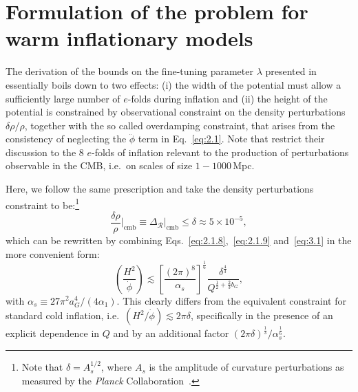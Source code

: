 \documentclass[aps,prd,twocolumn,amssymb,amsmath,floatfix,nofootinbib,superscriptaddress,preprintnumbers]{revtex4-1}
\begin{document}
\section{Formulation of the problem for warm inflationary models}
\label{sec:3}

The derivation of the bounds on the fine-tuning parameter $\lambda$ presented in~\cite{Adams:1990pn} essentially boils down to two effects: (i) the width of the potential must allow a sufficiently large number of $e$-folds during inflation and (ii)
the height of the potential is constrained by observational constraint on the density perturbations $\delta\rho/\rho$, together with the so called overdamping constraint, that arises from the consistency of neglecting the $\ddot{\phi}$ term in Eq.~\ref{eq:2.1}.  Note that \cite{Adams:1990pn} restrict their discussion to the 8 $e$-folds of inflation relevant to the production of perturbations observable in the CMB, i.e.\ on scales of size $1-1000\,$Mpc. %

Here, we follow the same prescription and take the density perturbations constraint to be:\footnote{Note that $\delta = A_s^{1/2}$, where $A_s$ is the amplitude of curvature perturbations as measured by the {\it Planck} Collaboration~\cite{Planck:2018nkj}.}
\begin{equation}
    \frac{\delta \rho}{\rho}\Big|_{\mathrm{\mathrm{cmb}}}\equiv \Delta_{\mathcal{R}}\Big|_{\mathrm{cmb}}\leq \delta\approx 5\times 10^{-5}, \label{eq:3.1}
\end{equation}
which can be rewritten by combining Eqs.~\ref{eq:2.1.8},~\ref{eq:2.1.9} and~\ref{eq:3.1} in the more convenient form:
\begin{equation}
    \left(\frac{H^2}{\Dot{\phi}}\right)\lesssim \left[\frac{(2\pi)^8}{\alpha_s}\right]^{\frac{1}{6}}\frac{\delta^{\frac{4}{3}}}{Q^{\frac{1}{2}+\frac{2}{3}b_G}}, \label{eq:3.3}
\end{equation}
with $\alpha_s\equiv 27\pi^2a_G^4/(4\alpha_1)$. This clearly differs from the equivalent constraint for standard cold inflation, i.e.\ $(H^2/\Dot{\phi})\lesssim 2\pi\delta$, specifically in the presence of an explicit dependence in $Q$ and by an additional factor $(2\pi\delta)^{\frac{1}{3}}/\alpha_s^{\frac{1}{6}}$.
\end{document}

